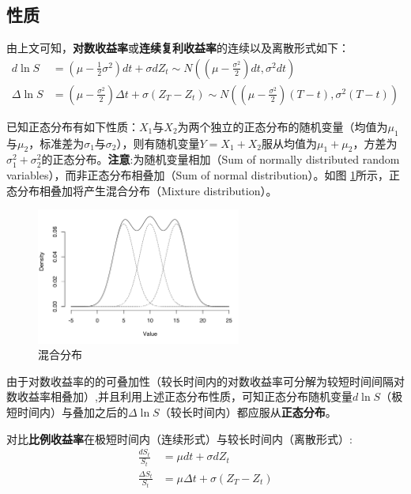 \documentclass[11pt]{article}
\begin{document}
\subsection{性质}

由上文可知，\textbf{对数收益率}或\textbf{连续复利收益率}的连续以及离散形式如下：
\begin{align*}
    d\ln S &= \left( \mu - \frac{1}{2}\sigma^2\right) dt + \sigma dZ_t \sim N \left( (\mu-\frac{\sigma^2}{2})dt, \sigma^2 dt \right) \\
    \Delta \ln S &= \left( \mu - \frac{\sigma^2}{2} \right) \Delta t + \sigma (Z_T - Z_t) \sim N \left((\mu-\frac{\sigma^2}{2})(T-t), \sigma^2(T-t) \right) 
\end{align*}

已知正态分布有如下性质：$X_1$与$X_2$为两个独立的正态分布的随机变量（均值为$\mu_1$与$\mu_2$，标准差为$\sigma_1$与$\sigma_2$），则有随机变量$Y=X_1+X_2$服从均值为$\mu_1+\mu_2$，方差为$\sigma_1^2+\sigma_2^2$的正态分布。\textbf{注意}:为随机变量相加（Sum of normally distributed random variables），而非正态分布相叠加（Sum of normal distribution）。如图
\ref{fig:mix-dist}所示，正态分布相叠加将产生混合分布（Mixture distribution）。
\begin{figure}[ht!]
    \centering
    \includegraphics[width=0.6\textwidth]{fig/gaussian-mixture-distribution.png}
    \caption{混合分布}
    \label{fig:mix-dist}
\end{figure}

由于对数收益率的的可叠加性（较长时间内的对数收益率可分解为较短时间间隔对数收益率相叠加）,并且利用上述正态分布性质，可知正态分布随机变量$d\ln S$（极短时间内）与叠加之后的$\Delta \ln S$（较长时间内）都应服从\textbf{正态分布}。

对比\textbf{比例收益率}在极短时间内（连续形式）与较长时间内（离散形式）:
\begin{align*}
    \frac{dS_t}{S_t} &= \mu dt + \sigma dZ_t \\
    \frac{\Delta S_t}{S_t} &= \mu \Delta t + \sigma(Z_T - Z_t)
\end{align*}
\end{document}

